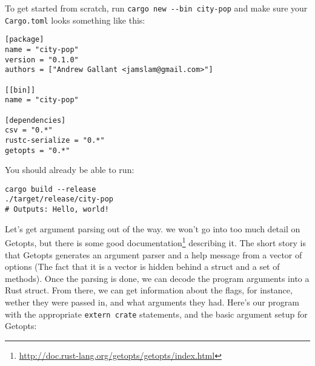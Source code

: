 \documentclass[a4paper,]{book}
\renewcommand{\href}[2]{#2\footnote{\url{#1}}}
\begin{document}
To get started from scratch, run \texttt{cargo\ new\ -\/-bin\ city-pop}
and make sure your \texttt{Cargo.toml} looks something like this:

\begin{verbatim}
[package]
name = "city-pop"
version = "0.1.0"
authors = ["Andrew Gallant <jamslam@gmail.com>"]

[[bin]]
name = "city-pop"

[dependencies]
csv = "0.*"
rustc-serialize = "0.*"
getopts = "0.*"
\end{verbatim}

You should already be able to run:

\begin{verbatim}
cargo build --release
./target/release/city-pop
# Outputs: Hello, world!
\end{verbatim}


Let's get argument parsing out of the way. we won't go into too much
detail on Getopts, but there is
\href{http://doc.rust-lang.org/getopts/getopts/index.html}{some good
documentation} describing it. The short story is that Getopts generates
an argument parser and a help message from a vector of options (The fact
that it is a vector is hidden behind a struct and a set of methods).
Once the parsing is done, we can decode the program arguments into a
Rust struct. From there, we can get information about the flags, for
instance, wether they were passed in, and what arguments they had.
Here's our program with the appropriate \texttt{extern\ crate}
statements, and the basic argument setup for Getopts:
\end{document}
